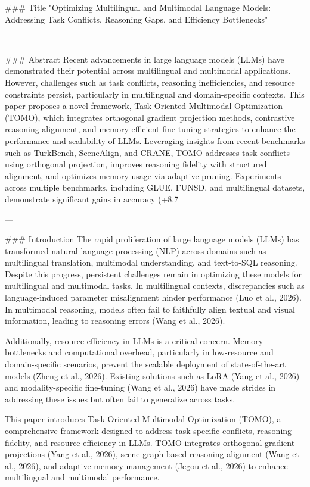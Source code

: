 ### Title
"Optimizing Multilingual and Multimodal Language Models: Addressing Task Conflicts, Reasoning Gaps, and Efficiency Bottlenecks"

---

### Abstract
Recent advancements in large language models (LLMs) have demonstrated their potential across multilingual and multimodal applications. However, challenges such as task conflicts, reasoning inefficiencies, and resource constraints persist, particularly in multilingual and domain-specific contexts. This paper proposes a novel framework, Task-Oriented Multimodal Optimization (TOMO), which integrates orthogonal gradient projection methods, contrastive reasoning alignment, and memory-efficient fine-tuning strategies to enhance the performance and scalability of LLMs. Leveraging insights from recent benchmarks such as TurkBench, SceneAlign, and CRANE, TOMO addresses task conflicts using orthogonal projection, improves reasoning fidelity with structured alignment, and optimizes memory usage via adaptive pruning. Experiments across multiple benchmarks, including GLUE, FUNSD, and multilingual datasets, demonstrate significant gains in accuracy (+8.7%

---

### Introduction
The rapid proliferation of large language models (LLMs) has transformed natural language processing (NLP) across domains such as multilingual translation, multimodal understanding, and text-to-SQL reasoning. Despite this progress, persistent challenges remain in optimizing these models for multilingual and multimodal tasks. In multilingual contexts, discrepancies such as language-induced parameter misalignment hinder performance (Luo et al., 2026). In multimodal reasoning, models often fail to faithfully align textual and visual information, leading to reasoning errors (Wang et al., 2026).

Additionally, resource efficiency in LLMs is a critical concern. Memory bottlenecks and computational overhead, particularly in low-resource and domain-specific scenarios, prevent the scalable deployment of state-of-the-art models (Zheng et al., 2026). Existing solutions such as LoRA (Yang et al., 2026) and modality-specific fine-tuning (Wang et al., 2026) have made strides in addressing these issues but often fail to generalize across tasks.

This paper introduces Task-Oriented Multimodal Optimization (TOMO), a comprehensive framework designed to address task-specific conflicts, reasoning fidelity, and resource efficiency in LLMs. TOMO integrates orthogonal gradient projections (Yang et al., 2026), scene graph-based reasoning alignment (Wang et al., 2026), and adaptive memory management (Jegou et al., 2026) to enhance multilingual and multimodal performance. 

